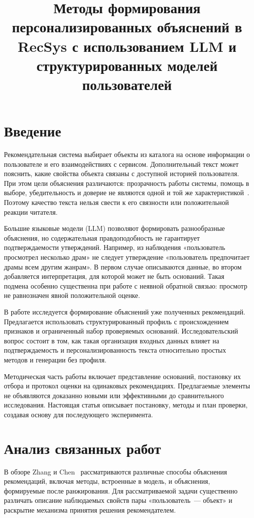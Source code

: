\documentclass{misisarticle}
\title{Методы формирования персонализированных объяснений в RecSys с использованием LLM и структурированных моделей пользователей}
\begin{document}
\maketitle

\section{Введение}

Рекомендательная система выбирает объекты из каталога на основе информации о пользователе и его взаимодействиях с сервисом. Дополнительный текст может пояснить, какие свойства объекта связаны с доступной историей пользователя. При этом цели объяснения различаются: прозрачность работы системы, помощь в выборе, убедительность и доверие не являются одной и той же характеристикой~\cite{survey}. Поэтому качество текста нельзя свести к его связности или положительной реакции читателя.

Большие языковые модели (LLM) позволяют формировать разнообразные объяснения, но содержательная правдоподобность не гарантирует подтверждаемости утверждений. Например, из наблюдения «пользователь просмотрел несколько драм» не следует утверждение «пользователь предпочитает драмы всем другим жанрам». В первом случае описываются данные, во втором добавляется интерпретация, для которой может не быть оснований. Такая подмена особенно существенна при работе с неявной обратной связью: просмотр не равнозначен явной положительной оценке.

В работе исследуется формирование объяснений уже полученных рекомендаций. Предлагается использовать структурированный профиль с происхождением признаков и ограниченный набор проверяемых оснований. Исследовательский вопрос состоит в том, как такая организация входных данных влияет на подтверждаемость и персонализированность текста относительно простых методов и генерации без профиля.

Методическая часть работы включает представление оснований, постановку их отбора и протокол оценки на одинаковых рекомендациях. Предлагаемые элементы не объявляются доказанно новыми или эффективными до сравнительного исследования. Настоящая статья описывает постановку, методы и план проверки, создавая основу для последующего эксперимента.

\section{Анализ связанных работ}

В обзоре Zhang и Chen~\cite{survey} рассматриваются различные способы объяснения рекомендаций, включая методы, встроенные в модель, и объяснения, формируемые после ранжирования. Для рассматриваемой задачи существенно различать описание наблюдаемых свойств пары «пользователь~--- объект» и раскрытие механизма принятия решения рекомендателем.
\end{document}
